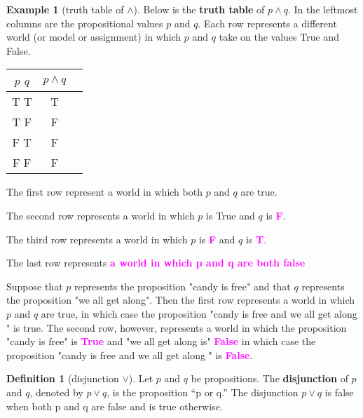 \documentclass[letterpaper,10pt]{article}
\theoremstyle{plain}
\theoremstyle{definition}
\newtheorem{defn}[thm]{Definition}
\newtheorem{exmp}[thm]{Example}
\theoremstyle{remark}
\providecommand{\land}{\ensuremath{\wedge}}
\providecommand{\lor}{\ensuremath{\vee}}
\providecommand{\todo}[1]{\textcolor{magenta}{\textbf{#1}}}
\begin{document}
\begin{exmp}[truth table of $\land$]
Below is the \textbf{truth table} of $p \land q$. In the leftmost columns are the propositional values $p$ and $q$. Each row represents a different world (or model or assignment) in which $p$ and $q$ take on the values True and False. 

\begin{center}
\begin{tabular}{ | c | c | c |} 
  \hline
 $p$ $q$ & $ p \land q$ \\
 \hline
  T T & T \\ 
  T F & F \\ 
  F T & F \\ 
  F F & F \\ 
  \hline
\end{tabular}
\end{center}

The first row represent a world in which both $p$ and $q$ are true. 

The second row represents a world in which $p$ is True and $q$ is \todo{F}.

The third row represents a world in which $p$ is \todo{F} and $q$ is \todo{T}.

The last row represents \todo{a world in which p and q are both false}

Suppose that $p$ represents the proposition "candy is free" and that $q$ represents the proposition "we all get along".
Then the first row represents a world in which $p$ and $q$ are true, in which case the proposition "candy is free and we all get along " is true. The second row, however, represents a world in which the proposition "candy is free" is \todo{True} and "we all get along is" \todo{False} in which case the proposition "candy is free and we all get along " is \todo{False}.
\end{exmp}


\newpage
\begin{defn}[disjunction $\lor$]
Let $p$ and $q$ be propositions. The \textbf{disjunction} of $p$ and $q$, denoted by $p \lor q$, is the proposition
“p or q.” The disjunction $p \lor q$ is false when both p and q are false and is true otherwise.
\end{defn}
\end{document}
